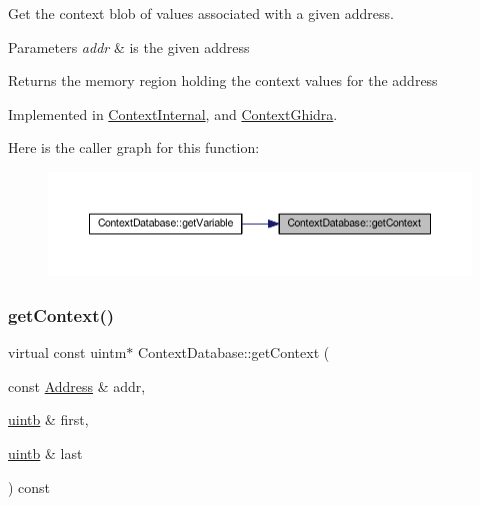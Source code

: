 Get the context blob of values associated with a given address. 


\begin{DoxyParams}{Parameters}
{\em addr} & is the given address \\
\hline
\end{DoxyParams}
\begin{DoxyReturn}{Returns}
the memory region holding the context values for the address 
\end{DoxyReturn}


Implemented in \mbox{\hyperlink{class_context_internal_a817dcba491a21368cfa81b522ff21b39}{Context\+Internal}}, and \mbox{\hyperlink{class_context_ghidra_a222fa5ff7a23b1b5242a6be7da1b438f}{Context\+Ghidra}}.

Here is the caller graph for this function\+:
\nopagebreak
\begin{figure}[H]
\begin{center}
\leavevmode
\includegraphics[width=350pt]{class_context_database_a780d39f9c8f7bafe9bbb7eb948d3f9ca_icgraph}
\end{center}
\end{figure}
\mbox{\label{class_context_database_adbc2e2f157fe56f212f0edb55435dd7d}} 
\subsubsection{\texorpdfstring{getContext()}{getContext()}\hspace{0.1cm}{\footnotesize\ttfamily [2/2]}}
{\footnotesize\ttfamily virtual const uintm$\ast$ Context\+Database\+::get\+Context (\begin{DoxyParamCaption}\item[{const \mbox{\hyperlink{class_address}{Address}} \&}]{addr,  }\item[{\mbox{\hyperlink{types_8h_a2db313c5d32a12b01d26ac9b3bca178f}{uintb}} \&}]{first,  }\item[{\mbox{\hyperlink{types_8h_a2db313c5d32a12b01d26ac9b3bca178f}{uintb}} \&}]{last }\end{DoxyParamCaption}) const\hspace{0.3cm}{\ttfamily [pure virtual]}}



